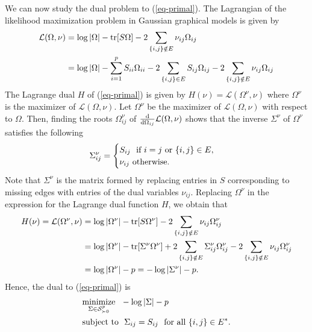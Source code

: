 We can now study the dual problem to (\ref{eq-primal}). The Lagrangian of the likelihood maximization problem in Gaussian graphical models is given by
\begin{align*}
    \mathcal{L}(\Omega, \nu)
    &= \log |\Omega| - {\textrm{tr}}[S\Omega] - 2 \sum_{{\left\{i, j\right\}} \notin E} \nu_{ij}\Omega_{ij}\\
    &= \log |\Omega| - \sum_{i=1}^p S_{ii}\Omega_{ii} - 2 \sum_{{\left\{i,j\right\}} \in E} S_{ij}\Omega_{ij} - 2 \sum_{{\left\{i, j\right\}} \notin E} \nu_{ij}\Omega_{ij}
\end{align*}
The Lagrange dual $H$ of (\ref{eq-primal}) is given by $H(\nu) = \mathcal{L}(\Omega^\nu, \nu)$ where $\Omega^\nu$ is the maximizer of $\mathcal{L}(\Omega, \nu)$. Let $\Omega^\nu$ be the maximizer of $\mathcal{L}(\Omega, \nu)$ with respect to $\Omega$. Then, finding the roots $\Omega^\nu_{ij}$ of $\frac{\text{d}}{\text{d}\Omega_{ij}} {\mathcal{L}}(\Omega, \nu)$ shows that the inverse $\Sigma^\nu$ of $\Omega^\nu$ satisfies the following
\begin{equation*}
    \Sigma^\nu_{ij} = \begin{cases}
        S_{ij}\ {\textrm{ if }} i = j {\textrm{ or }} {\left\{i, j\right\}} \in E,\\
        \nu_{ij}\ {\textrm{otherwise}}.
    \end{cases}
\end{equation*}
Note that $\Sigma^\nu$ is the matrix formed by replacing entries in $S$ corresponding to missing edges with entries of the dual variables $\nu_{ij}$. Replacing $\Omega^\nu$ in the expression for the Lagrange dual function $H$, we obtain that
\begin{align*}
    H(\nu) 
    = {\mathcal{L}}(\Omega^\nu, \nu)
    &= \log |\Omega^\nu| - {\textrm{tr}}[S\Omega^\nu] - 2 \sum_{{\left\{i, j\right\}} \notin E} \nu_{ij}\Omega^\nu_{ij}\\
    &= \log |\Omega^\nu| - {\textrm{tr}}[\Sigma^\nu\Omega^\nu] + 2 \sum_{{\left\{i, j\right\}} \notin E} \Sigma^\nu_{ij}\Omega^\nu_{ij} - 2 \sum_{{\left\{i, j\right\}} \notin E} \nu_{ij}\Omega^\nu_{ij}\\
    &= \log |\Omega^\nu| - p = -\log |\Sigma^\nu| - p.
\end{align*}
Hence, the dual to (\ref{eq-primal}) is
\begin{align} \label{eq-dual}
    \begin{split}
        &\underset{\Sigma \in \S^p_{\succ 0}}{\t{minimize}}\ \  -\log |\Sigma| - p\\
        &\t{subject to}\ \ \Sigma_{ij} = S_{ij}\ \t{ for all } \eset{i, j} \in E^*.
    \end{split}
\end{align}
